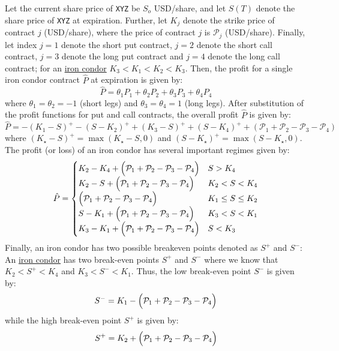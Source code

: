 \documentclass[11pt]{article}
\theoremstyle{definition}
\begin{document}
Let the current share price of \texttt{XYZ} be $S_{o}$ USD/share, and let $S(T)$ denote the share price of \texttt{XYZ} at expiration. 
Further, let $K_{j}$ denote the strike price of contract $j$ (USD/share), where the price of contract $j$ is $\mathcal{P}_{j}$ (USD/share). 
Finally, let index $j=1$ denote the short put contract, $j=2$ denote the short call contract,  $j=3$ denote the long put contract and  $j=4$ denote the long call contract; 
for an \href{https://www.investopedia.com/terms/i/ironcondor.asp}{iron condor} $K_{3} < K_{1} <K_{2} < K_{3}$. 
Then, the profit for a single iron condor contract $\hat{P}$ at expiration is given by:
\begin{equation}
\hat{P} = \theta_{1}P_{1} + \theta_{2}P_{2} + \theta_{3}P_{3} + \theta_{4}P_{4}
\end{equation}
where $\theta_{1}=\theta_{2} = -1$ (short legs) and $\theta_{3}=\theta_{4} = 1$ (long legs). 
After substitution of the profit functions for put and call contracts, the overall profit $\hat{P}$ is given by:
\begin{equation}
\hat{P} = -(K_{1}-S)^{+} - (S-K_{2})^{+} + (K_{3} - S)^{+} + (S-K_{4})^{+} + \left(\mathcal{P}_{1} + \mathcal{P}_{2} - \mathcal{P}_{3}-\mathcal{P}_{4}\right)
\end{equation}
where $(K_{\star}-S)^{+}=\max(K_{\star}-S,0)$ and $(S-K_{\star})^{+} = \max(S-K_{\star},0)$. 
The profit (or loss) of an iron condor has several important regimes given by:
\begin{equation}
\hat{P} = \begin{cases}
  K_{2} - K_{4} + \Bigl(\mathcal{P}_{1} + \mathcal{P}_{2} - \mathcal{P}_{3}-\mathcal{P}_{4}\Bigr)  & S>K_{4} \\
  K_{2} - S + \Bigl(\mathcal{P}_{1} + \mathcal{P}_{2} - \mathcal{P}_{3}-\mathcal{P}_{4}\Bigr)  & K_{2}<S<K_{4} \\
  \Bigl(\mathcal{P}_{1} + \mathcal{P}_{2} - \mathcal{P}_{3}-\mathcal{P}_{4}\Bigr) & K_{1}\leq{S}\leq{K_{2}} \\
  S - K_{1} + \Bigl(\mathcal{P}_{1} + \mathcal{P}_{2} - \mathcal{P}_{3}-\mathcal{P}_{4}\Bigr) & K_{3}<S<K_{1} \\
  K_{3} - K_{1} + \Bigl(\mathcal{P}_{1} + \mathcal{P}_{2} - \mathcal{P}_{3}-\mathcal{P}_{4}\Bigr) & S<K_{3}
\end{cases}
\end{equation}
Finally, an iron condor has two possible breakeven points denoted as $S^{+}$ and $S^{-}$:
An \href{https://www.investopedia.com/terms/i/ironcondor.asp}{iron condor} has two break-even points $S^{+}$ and $S^{-}$ 
where we know that $K_{2}<S^{+}<K_{4}$ and $K_{3}<S^{-}<K_{1}$. Thus, the low break-even point $S^{-}$ is given by:
\begin{equation}
S^{-} = K_{1} - \Bigl(\mathcal{P}_{1} + \mathcal{P}_{2} - \mathcal{P}_{3}-\mathcal{P}_{4}\Bigr)
\end{equation}
while the high break-even point $S^{+}$ is given by:
\begin{equation}
S^{+} = K_{2} + \Bigl(\mathcal{P}_{1} + \mathcal{P}_{2} - \mathcal{P}_{3}-\mathcal{P}_{4}\Bigr)
\end{equation}
\end{document}
